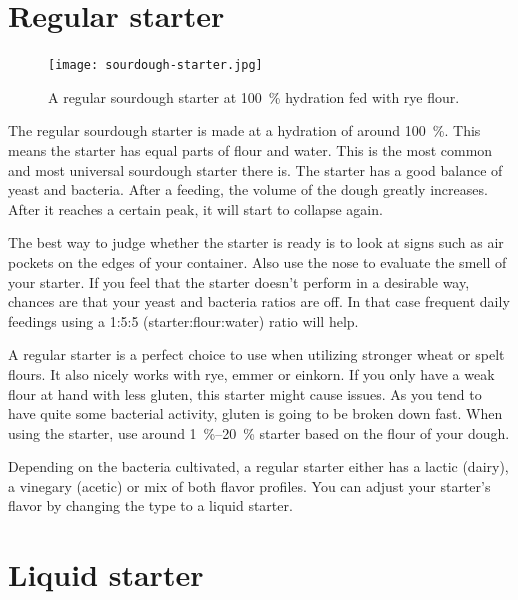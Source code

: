 \section{Regular starter}%
\label{sec:regular-starter}

\begin{figure}[!htb]
  \texttt{[image: sourdough-starter.jpg]}
  \caption[Regular starter]{A regular sourdough starter at \qty{100}{\percent}
      hydration fed with rye flour.}%
  \label{fig:regular-sourdough-starter}
\end{figure}

The regular sourdough starter is made at a hydration of around \qty{100}{\percent}.
This means the starter has equal parts of flour and water. This is the most
common and most universal sourdough starter there is. The starter has a good
balance of yeast and bacteria. After a feeding, the volume of the dough
greatly increases. After it reaches a certain peak, it will start to collapse again.

The best way to judge whether the starter is ready is to look at signs such as
air pockets on the edges of your container. Also use the nose to evaluate the
smell of your starter. If you feel that the starter doesn't perform in a
desirable way, chances are that your yeast and bacteria ratios are off. In that
case frequent daily feedings using a 1:5:5 (starter:flour:water) ratio will
help.

A regular starter is a perfect choice to use when utilizing stronger wheat or spelt flours.
It also nicely works with rye, emmer or einkorn. If you only have a weak flour
at hand with less gluten, this starter might cause issues. As you tend to have
quite some bacterial activity, gluten is going to be broken down fast. When
using the starter, use around \qtyrange{1}{20}{\percent} starter based on the flour of your
dough.

Depending on the bacteria cultivated, a regular starter either has a lactic (dairy),
a vinegary (acetic) or mix of both flavor profiles. You can adjust your
starter's flavor by changing the type to a liquid starter.

\section{Liquid starter}%
\label{sec:liquid-starter}

